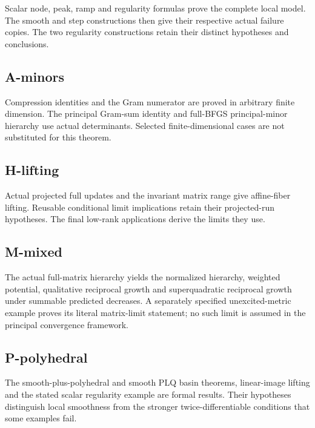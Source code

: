 Scalar node, peak, ramp and regularity formulas prove the complete local model. The smooth and step constructions then give their respective actual failure copies. The two regularity constructions retain their distinct hypotheses and conclusions.



\subsection{A-minors}\label{a-minors}

Compression identities and the Gram numerator are proved in arbitrary finite dimension. The principal Gram-sum identity and full-BFGS principal-minor hierarchy use actual determinants. Selected finite-dimensional cases are not substituted for this theorem.



\subsection{H-lifting}\label{h-lifting}

Actual projected full updates and the invariant matrix range give affine-fiber lifting. Reusable conditional limit implications retain their projected-run hypotheses. The final low-rank applications derive the limits they use.



\subsection{M-mixed}\label{m-mixed}

The actual full-matrix hierarchy yields the normalized hierarchy, weighted potential, qualitative reciprocal growth and superquadratic reciprocal growth under summable predicted decreases. A separately specified unexcited-metric example proves its literal matrix-limit statement; no such limit is assumed in the principal convergence framework.



\subsection{P-polyhedral}\label{p-polyhedral}

The smooth-plus-polyhedral and smooth PLQ basin theorems, linear-image lifting and the stated scalar regularity example are formal results. Their hypotheses distinguish local smoothness from the stronger twice-differentiable conditions that some examples fail.

